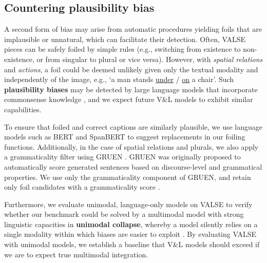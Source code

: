 \documentclass[11pt]{article}
\newcommand{\gr}[1]{\textcolor{niceblue}{#1}}
\newcommand\red[1]{\textcolor{niceorange}{#1}}
\newcommand{\dataset}{VALSE}
\begin{document}
\subsection{Countering plausibility bias}\label{subsec:why-unimodal}



A second form of bias may arise from automatic procedures yielding foils that are implausible or unnatural, which can facilitate their detection. 
Often, \dataset{} pieces can be safely foiled by simple rules
(e.g., switching from existence to non-existence, or from singular to plural or vice versa).
However, with \textit{spatial relations} and \textit{actions}, a foil could be deemed unlikely given only the textual modality and independently of the image, e.g., `a man stands \underline{\red{under}} / \underline{\gr{on}} a chair'.
Such \textbf{plausibility biases} may be detected by large language models that incorporate commonsense knowledge \cite{petroni-etal-2019-language, wang2020language}, and we expect future V\&L models to exhibit similar capabilities.

To ensure that foiled and correct captions are similarly plausible,
we use language models such as BERT \cite{devlin2019bert} and SpanBERT \cite{joshi-etal-2020-spanbert} to suggest
replacements in our foiling functions.
Additionally, in the case of spatial relations and plurals, we also apply a grammaticality filter using GRUEN \cite{zhu-bhat-2020-gruen}. GRUEN was originally proposed to automatically score generated sentences based on discourse-level and grammatical properties. We use only the grammaticality component of GRUEN, and retain only foil candidates with a grammaticality score .

Furthermore, we evaluate unimodal, language-only models on \dataset{} to verify
whether our benchmark could be solved by a multimodal model with strong linguistic capacities in \textbf{unimodal collapse}, whereby a model silently relies on a single modality within which biases are easier to exploit \cite{goyal2017making, shekhar-etal-2019-evaluating}.
By evaluating \dataset{} with unimodal models, we establish a baseline that V\&L models should exceed if we are to expect true multimodal integration.
\end{document}
